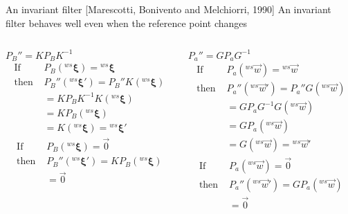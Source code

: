 \begin{frame}{An invariant filter [Marescotti, Bonivento and Melchiorri, 1990]}
  An invariant filter behaves well even when the reference point changes
  \begin{columns}
    \begin{column}{0.5\columnwidth}
      \begin{block}{$P_B'' = K P_B K^{-1}$}
        \vskip-0.1in
        \[
        \begin{split}
          \text{If } & P_B ({}^{ws}\boldsymbol{\xi}) = {}^{ws}\boldsymbol{\xi}\\
          \text{then } &P_B'' ({}^{ws}\boldsymbol{\xi}') = P_B'' K ({}^{ws}\boldsymbol{\xi}) \\
          &=K P_B K^{-1} K ({}^{ws}\boldsymbol{\xi})\\
          &=K P_B ({}^{ws}\boldsymbol{\xi})\\
          &=K ({}^{ws}\boldsymbol{\xi}) = {}^{ws}\boldsymbol{\xi}'
        \end{split}
        \]
        \[
        \begin{split}
          \text{If } & P_B ({}^{ws}\boldsymbol{\xi}) = \vec{0}\\
          \text{then } &P_B'' ({}^{ws}\boldsymbol{\xi}') =K P_B ({}^{ws}\boldsymbol{\xi})\\
          &= \vec{0}
        \end{split}
        \]
      \end{block}
    \end{column}
    \begin{column}{0.5\columnwidth}
      \begin{block}{$P_a'' = G P_a G^{-1}$}
        \vskip-0.1in
        \[
        \begin{split}
          \text{If } & P_a ({}^{ws}\vec{w}) = {}^{ws}\vec{w}\\
          \text{then } &P_a'' ({}^{ws}\vec{w}') = P_a'' G ({}^{ws}\vec{w}) \\
          &=G P_a G^{-1} G ({}^{ws}\vec{w})\\
          &=G P_a ({}^{ws}\vec{w})\\
          &=G ({}^{ws}\vec{w}) = {}^{ws}\vec{w}'
        \end{split}
        \]
        \[
        \begin{split}
          \text{If } & P_a ({}^{ws}\vec{w}) = \vec{0}\\
          \text{then } &P_a'' ({}^{ws}\vec{w}') =G P_a ({}^{ws}\vec{w})\\
          &= \vec{0}
        \end{split}
        \]
      \end{block}
    \end{column}
  \end{columns}
\end{frame}

